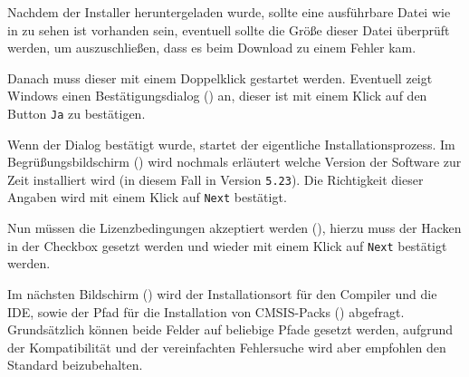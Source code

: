 
Nachdem der Installer heruntergeladen wurde, sollte eine ausführbare Datei  wie in  zu sehen ist vorhanden sein, eventuell sollte die Größe dieser Datei überprüft werden, um auszuschließen, dass es beim Download zu einem Fehler kam.


Danach muss dieser mit einem Doppelklick gestartet werden. Eventuell zeigt Windows einen Bestätigungsdialog () an, dieser ist mit einem Klick auf den Button \texttt{Ja} zu bestätigen.


Wenn der Dialog bestätigt wurde, startet der eigentliche Installationsprozess. Im Begrüßungsbildschirm () wird nochmals erläutert welche Version der Software zur Zeit installiert wird (in diesem Fall \uVision{} in Version \texttt{5.23}). Die Richtigkeit dieser Angaben wird mit einem Klick auf \texttt{Next} bestätigt.


Nun müssen die Lizenzbedingungen akzeptiert werden (), hierzu muss der Hacken in der Checkbox gesetzt werden und wieder mit einem Klick auf \texttt{Next} bestätigt werden.


Im nächsten Bildschirm () wird der Installationsort für den Compiler und die IDE, sowie der Pfad für die Installation von \gls{CMSIS}-Packs () abgefragt. Grundsätzlich können beide Felder auf beliebige Pfade gesetzt werden, aufgrund der Kompatibilität und der vereinfachten Fehlersuche wird aber empfohlen den Standard beizubehalten.


